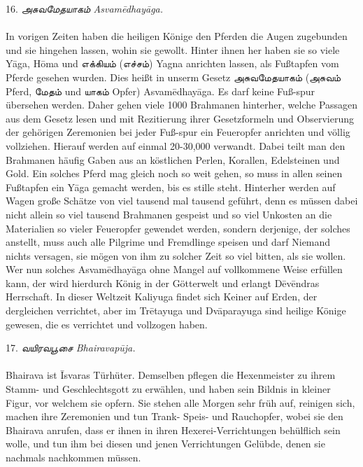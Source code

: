 \documentclass{article}
\newcommand{\TamilText}[1]{\texttamil{#1}}
\newcommand{\tam}[1]{\TamilText{#1}}
\begin{document}
\begin{center}
16. \emph{\tam{அசுவமேதயாகம்} Asvam\={e}dhay\={a}ga.}
\end{center}
\paragraph{}
In vorigen Zeiten haben die heiligen Könige den Pferden die Augen zugebunden und sie hingehen lassen, wohin sie gewollt. Hinter ihnen her haben sie so viele Y\={a}ga, H\={o}ma und \tam{எக்கியம்} (\tam{எச்சம்}) Yagna anrichten lassen, als Fußtapfen vom Pferde gesehen wurden. Dies heißt in unserm Gesetz \tam{அசுவமேதயாகம்} (\tam{அசுவம்} Pferd, \tam{மேதம்} und \tam{யாகம்} Opfer) Asvam\={e}dhay\={a}ga. Es darf keine Fuß-spur übersehen werden. Daher gehen viele 1000 Brahmanen hinterher, welche Passagen aus dem Gesetz lesen und mit Rezitierung ihrer Gesetzformeln und Observierung der gehörigen Zeremonien bei jeder Fuß-spur ein Feueropfer anrichten und völlig vollziehen. Hierauf werden auf einmal 20-30,000 verwandt. Dabei teilt man den Brahmanen häufig Gaben aus an köstlichen Perlen, Korallen, Edelsteinen und Gold. Ein solches Pferd mag gleich noch so weit gehen, so muss in allen seinen Fußtapfen ein Y\={a}ga gemacht werden, bis es stille steht. Hinterher werden auf Wagen große Schätze von viel tausend mal tausend geführt, denn es müssen dabei nicht allein so viel tausend Brahmanen gespeist und so viel Unkosten an die Materialien so vieler Feueropfer gewendet werden, sondern derjenige, der solches anstellt, muss auch alle Pilgrime und Fremdlinge speisen und darf Niemand nichts versagen, sie mögen von ihm zu solcher Zeit so viel bitten, als sie wollen. Wer nun solches Asvam\={e}dhay\={a}ga ohne Mangel auf vollkommene Weise erfüllen kann, der wird hierdurch König in der Götterwelt und erlangt D\={e}v\={e}ndras Herrschaft. In dieser Weltzeit Kaliyuga findet sich Keiner auf Erden, der dergleichen verrichtet, aber im Tr\={e}tayuga und Dv\={a}parayuga sind heilige Könige gewesen, die es verrichtet und vollzogen haben.

\begin{center}
17. \emph{\tam{வயிரவபூசை} Bhairavap\={u}ja.}
\end{center}
\paragraph{}
Bhairava ist \={I}svaras Türhüter. Demselben pflegen die Hexenmeister zu ihrem Stamm- und Geschlechtsgott zu erwählen, und haben sein Bildnis in kleiner Figur, vor welchem sie opfern. Sie stehen alle Morgen sehr früh auf, reinigen sich, machen ihre Zeremonien und tun Trank- Speis- und Rauchopfer, wobei sie den Bhairava anrufen, dass er ihnen in ihren Hexerei-Verrichtungen behülflich sein wolle, und tun ihm bei diesen und jenen Verrichtungen Gelübde, denen sie nachmals nachkommen müssen.
\end{document}

